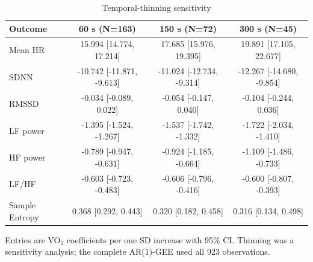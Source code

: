 \begin{table}[htbp]
\centering
\begin{threeparttable}
\begin{tabular}{lccc}
\toprule
Outcome & 60 s (N=163) & 150 s (N=72) & 300 s (N=45) \\
\midrule
Mean HR & 15.994 [14.774, 17.214] & 17.685 [15.976, 19.395] & 19.891 [17.105, 22.677] \\
SDNN & -10.742 [-11.871, -9.613] & -11.024 [-12.734, -9.314] & -12.267 [-14.680, -9.854] \\
RMSSD & -0.034 [-0.089, 0.022] & -0.054 [-0.147, 0.040] & -0.104 [-0.244, 0.036] \\
LF power & -1.395 [-1.524, -1.267] & -1.537 [-1.742, -1.332] & -1.722 [-2.034, -1.410] \\
HF power & -0.789 [-0.947, -0.631] & -0.924 [-1.185, -0.664] & -1.109 [-1.486, -0.733] \\
LF/HF & -0.603 [-0.723, -0.483] & -0.606 [-0.796, -0.416] & -0.600 [-0.807, -0.393] \\
Sample Entropy & 0.368 [0.292, 0.443] & 0.320 [0.182, 0.458] & 0.316 [0.134, 0.498] \\
\bottomrule
\end{tabular}\begin{tablenotes}\footnotesize\item Entries are VO$_2$ coefficients per one SD increase with 95\% CI. Thinning was a sensitivity analysis; the complete AR(1)-GEE used all 923 observations.\end{tablenotes}
\end{threeparttable}
\caption{Temporal-thinning sensitivity}
\label{tab:s1-thinning}
\end{table}
